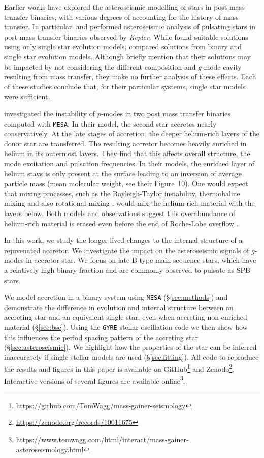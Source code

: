 \documentclass[desactivate]{aa}
\begin{document}
Earlier works have explored the asteroseismic modelling of stars in post mass-transfer binaries, with various degrees of accounting for the history of mass transfer. In particular, \citet{Guo2017b, Guo+2017:2017ApJ...837..114G} and \citet{Chen2021} performed asteroseismic analysis of pulsating stars in post-mass transfer binaries observed by {\it Kepler}. While \citet{Guo2017b,Guo+2017:2017ApJ...837..114G} found suitable solutions using only single star evolution models, \citet{Chen2021} compared solutions from binary and single star evolution models. Although \citet{Guo+2017:2017ApJ...837..114G} briefly mention that their solutions may be impacted by not considering the different composition and $g$-mode cavity resulting from mass transfer, they make no further analysis of these effects. Each of these studies conclude that, for their particular systems, single star models were sufficient. 

\citet{Miszuda+2021,Miszuda+2022:2022MNRAS.514..622M} investigated the instability of $p$-modes in two post mass transfer binaries computed with \texttt{MESA}. In their model, the second star accretes nearly conservatively. At the late stages of accretion, the deeper helium-rich layers of the donor star are transferred. The resulting accretor becomes heavily enriched in helium in its outermost layers. They find that this affects overall structure, the mode excitation and pulsation frequencies. In their models, the enriched layer of helium stays is only present at the surface leading to an inversion of average particle mass (mean molecular weight, see their Figure~10). One would expect that mixing processes, such as the Rayleigh-Taylor instability, thermohaline mixing and also rotational mixing \citep{Kippenhahn+1980, Cantiello+2007}, would mix the helium-rich material with the layers below. Both models and observations suggest this overabundance of helium-rich material is erased even before the end of Roche-Lobe overflow \citep{Renzo+2021}.

In this work, we study the longer-lived changes to the internal structure of a rejuvenated accretor.  We investigate the impact on the asteroseismic signals of $g$-modes in accretor star.  We focus on late B-type main sequence stars, which have a relatively high binary fraction and are commonly observed to pulsate as SPB stars. 

We model accretion in a binary system using \texttt{MESA} (\S\ref{sec:methods}) and demonstrate the difference in evolution and internal structure between an accreting star and an equivalent single star, even when accreting non-enriched material (\S\ref{sec:bse}). Using the \texttt{GYRE} stellar oscillation code we then show how this influences the period spacing pattern of the accreting star (\S\ref{sec:asteroseismic}). We highlight how the properties of the star can be inferred inaccurately if single stellar models are used (\S\ref{sec:fitting}). All code to reproduce the results and figures in this paper is available on GitHub\footnote{\url{https://github.com/TomWagg/mass-gainer-seismology}} and Zenodo\footnote{\url{https://zenodo.org/records/10011675}\label{zenodo_note}}. Interactive versions of several figures are available online\footnote{\url{https://www.tomwagg.com/html/interact/mass-gainer-asteroseismology.html}}.
\end{document}
